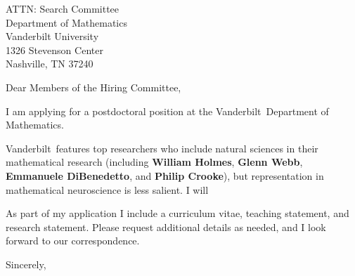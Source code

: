 \documentclass[11pt,a4paper]{letter}
\begin{document}

\def\School{Vanderbilt}

\begin{letter}
{ATTN: Search Committee\\
Department of Mathematics\\
Vanderbilt University\\
1326 Stevenson Center\\
Nashville, TN 37240}


\opening{Dear Members of the Hiring Committee,}

I am applying for a postdoctoral position at the \School~Department of Mathematics. 



\School~features top researchers who include natural sciences in their mathematical research (including \textbf{William Holmes}, \textbf{Glenn Webb}, \textbf{Emmanuele DiBenedetto}, and \textbf{Philip Crooke}), but representation in mathematical neuroscience is less salient. I will 



As part of my application I include a curriculum vitae, teaching statement, and research statement. Please request additional details as needed, and I look forward to our correspondence.

\closing{Sincerely,}
\end{letter}
\end{document}
